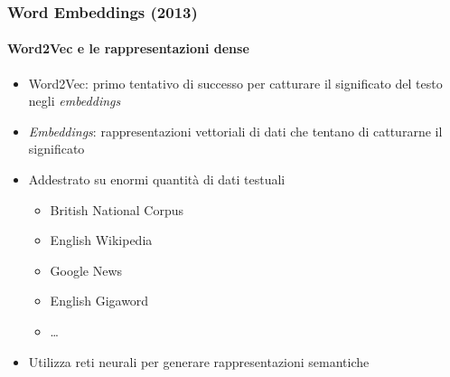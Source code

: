 \begin{frame}[t,fragile] \frametitle{Word Embeddings (2013)}
	\framesubtitle{Word2Vec e le rappresentazioni dense}
	    \begin{minipage}[t]{\textwidth}
	    	\begin{itemize}[leftmargin=10pt,align=right]
				\onslide<1->\item[\alert{\faArrowCircleRight}] \alert{Word2Vec:} primo tentativo di successo per catturare il significato del testo negli \textit{embeddings}
				\onslide<2->\item[\alert{\faArrowCircleRight}] \alert{\textit{Embeddings}:} rappresentazioni vettoriali di dati che tentano di catturarne il significato
				\onslide<3->\item[\alert{\faArrowCircleRight}] Addestrato su \alert{enormi quantità} di dati testuali
				\begin{itemize}[leftmargin=10pt,align=right]
					\item[\alert{\faArrowCircleRight}] British National Corpus
					\item[\alert{\faArrowCircleRight}] English Wikipedia
					\item[\alert{\faArrowCircleRight}] Google News
					\item[\alert{\faArrowCircleRight}] English Gigaword
					\item[\alert{\faArrowCircleRight}] \ldots
				\end{itemize}
				\item[\alert{\faArrowCircleRight}] Utilizza \alert{reti neurali} per generare rappresentazioni semantiche
			\end{itemize}
	    \end{minipage}
\end{frame}
%
